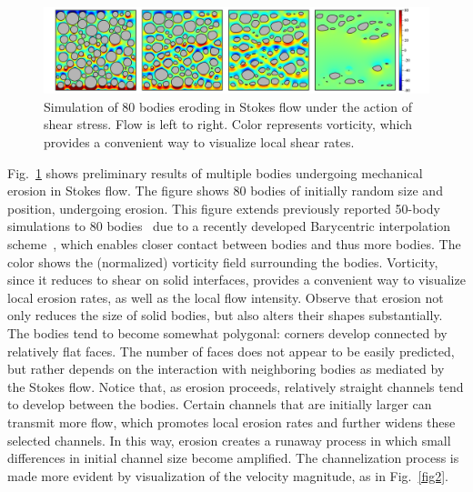 \documentclass[11pt]{article}
\begin{document}

\begin{figure}%
\begin{center}
\includegraphics[width = 0.99 \textwidth]{./figs/80circ8vort.pdf}
\caption{\label{fig1} Simulation of 80 bodies eroding in Stokes flow under the action of shear stress. Flow is left to right. Color represents vorticity, which provides a convenient way to visualize local shear rates. 
}
\end{center}
\end{figure}
 
Fig.~\ref{fig1} shows preliminary results of multiple bodies undergoing mechanical erosion in Stokes flow. The figure shows 80 bodies of initially random size and position, undergoing erosion. This figure extends previously reported 50-body simulations to 80 bodies~\cite{Quaife2018} due to a recently developed Barycentric interpolation scheme~\cite{bar2014, bar-wu-vee2015}, which enables closer contact between bodies and thus more bodies.
The color shows the (normalized) vorticity field surrounding the bodies. Vorticity, since it reduces to shear on solid interfaces, provides a convenient way to visualize local erosion rates, as well as the local flow intensity. Observe that erosion not only reduces the size of solid bodies, but also alters their shapes substantially. The bodies tend to become somewhat polygonal: corners develop connected by relatively flat faces. The number of faces does not appear to be easily predicted, but rather depends on the interaction with neighboring bodies as mediated by the Stokes flow. Notice that, as erosion proceeds, relatively straight channels tend to develop between the bodies. Certain channels that are initially larger can transmit more flow, which promotes local erosion rates and further widens these selected channels. In this way, erosion creates a runaway process in which small differences in initial channel size become amplified. The channelization process is made more evident by visualization of the velocity magnitude, as in Fig.~\ref{fig2}.
\end{document}
